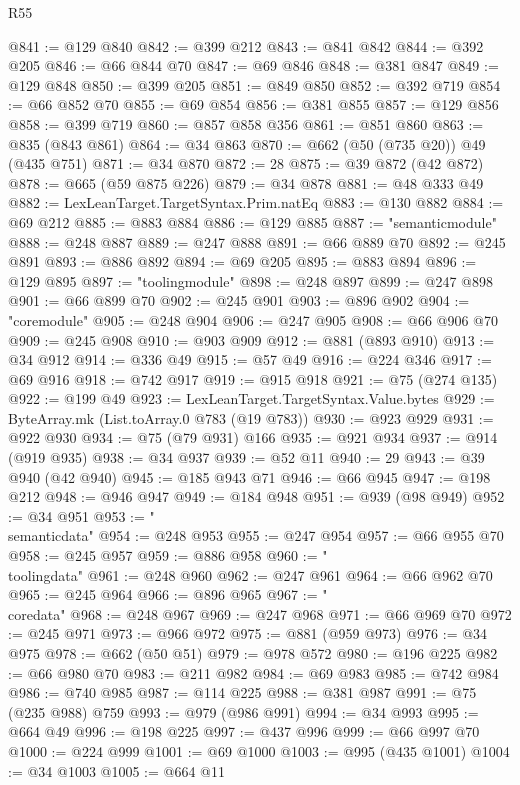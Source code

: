 \begin{lexlean}{R55}
\begin{coremodule}
@841 := @129 @840
@842 := @399 @212
@843 := @841 @842
@844 := @392 @205
@846 := @66 @844 @70
@847 := @69 @846
@848 := @381 @847
@849 := @129 @848
@850 := @399 @205
@851 := @849 @850
@852 := @392 @719
@854 := @66 @852 @70
@855 := @69 @854
@856 := @381 @855
@857 := @129 @856
@858 := @399 @719
@860 := @857 @858 @356
@861 := @851 @860
@863 := @835 (@843 @861)
@864 := @34 @863
@870 := @662 (@50 (@735 @20)) @49 (@435 @751)
@871 := @34 @870
@872 := 28
@875 := @39 @872 (@42 @872)
@878 := @665 (@59 @875 @226)
@879 := @34 @878
@881 := @48 @333 @49
@882 := LexLeanTarget.TargetSyntax.Prim.natEq
@883 := @130 @882
@884 := @69 @212
@885 := @883 @884
@886 := @129 @885
@887 := "semanticmodule"
@888 := @248 @887
@889 := @247 @888
@891 := @66 @889 @70
@892 := @245 @891
@893 := @886 @892
@894 := @69 @205
@895 := @883 @894
@896 := @129 @895
@897 := "toolingmodule"
@898 := @248 @897
@899 := @247 @898
@901 := @66 @899 @70
@902 := @245 @901
@903 := @896 @902
@904 := "coremodule"
@905 := @248 @904
@906 := @247 @905
@908 := @66 @906 @70
@909 := @245 @908
@910 := @903 @909
@912 := @881 (@893 @910)
@913 := @34 @912
@914 := @336 @49
@915 := @57 @49
@916 := @224 @346
@917 := @69 @916
@918 := @742 @917
@919 := @915 @918
@921 := @75 (@274 @135)
@922 := @199 @49
@923 := LexLeanTarget.TargetSyntax.Value.bytes
@929 := ByteArray.mk (List.toArray.{0} @783 (@19 @783))
@930 := @923 @929
@931 := @922 @930
@934 := @75 (@79 @931) @166
@935 := @921 @934
@937 := @914 (@919 @935)
@938 := @34 @937
@939 := @52 @11
@940 := 29
@943 := @39 @940 (@42 @940)
@945 := @185 @943 @71
@946 := @66 @945
@947 := @198 @212
@948 := @946 @947
@949 := @184 @948
@951 := @939 (@98 @949)
@952 := @34 @951
@953 := "\\semanticdata"
@954 := @248 @953
@955 := @247 @954
@957 := @66 @955 @70
@958 := @245 @957
@959 := @886 @958
@960 := "\\toolingdata"
@961 := @248 @960
@962 := @247 @961
@964 := @66 @962 @70
@965 := @245 @964
@966 := @896 @965
@967 := "\\coredata"
@968 := @248 @967
@969 := @247 @968
@971 := @66 @969 @70
@972 := @245 @971
@973 := @966 @972
@975 := @881 (@959 @973)
@976 := @34 @975
@978 := @662 (@50 @51)
@979 := @978 @572
@980 := @196 @225
@982 := @66 @980 @70
@983 := @211 @982
@984 := @69 @983
@985 := @742 @984
@986 := @740 @985
@987 := @114 @225
@988 := @381 @987
@991 := @75 (@235 @988) @759
@993 := @979 (@986 @991)
@994 := @34 @993
@995 := @664 @49
@996 := @198 @225
@997 := @437 @996
@999 := @66 @997 @70
@1000 := @224 @999
@1001 := @69 @1000
@1003 := @995 (@435 @1001)
@1004 := @34 @1003
@1005 := @664 @11

\end{coremodule}
\end{lexlean}
